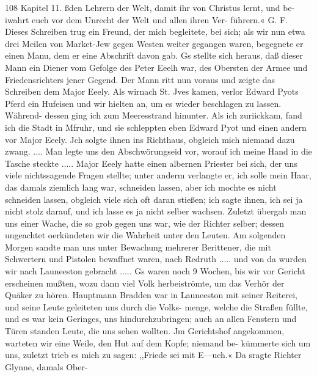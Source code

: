 108 Kapitel 11.
ßden Lehrern der Welt, damit ihr von Christus lernt, und be-
iwahrt euch vor dem Unrecht der Welt und allen ihren Ver-
führern.« G. F.
Dieses Schreiben trug ein Freund, der mich begleitete, bei
sich; als wir nun etwa drei Meilen von Market-Jew gegen
Westen weiter gegangen waren, begegnete er einen Manu, dem
er eine Abschrift davon gab. Gs stellte sich heraus, daß dieser
Mann ein Diener vom Gefolge des Peter Eeelh war, des
Obersten der Armee und Friedensrichters jener Gegend. Der Mann
ritt nun voraus und zeigte das Schreiben dem Major Eeely. Als
wirnach St. Jves kamen, verlor Edward Pyots Pferd ein Hufeisen
und wir hielten an, um es wieder beschlagen zu lassen. Während-
dessen ging ich zum Meeresstrand hinunter. Als ich zuriickkam,
fand ich die Stadt in Mfruhr, und sie schleppten eben Edward
Pyot und einen andern vor Major Eeely. Jch solgte ihnen ins
Richthaus, obgleich mich niemand dazu zwang. .... Man
legte uns den Abschwörungseid vor, worauf ich meine Hand in
die Tasche steckte ..... Major Eeely hatte einen albernen
Priester bei sich, der uns viele nichtssagende Fragen stellte; unter
anderm verlangte er, ich solle mein Haar, das damals ziemlich
lang war, schneiden lassen, aber ich mochte es nicht schneiden
lassen, obgleich viele sich oft daran stießen; ich sagte ihnen, ich
sei ja nicht stolz darauf, und ich lasse es ja nicht selber wachsen.
Zuletzt übergab man uns einer Wache, die so grob gegen uns
war, wie der Richter selber; dessen ungeachtet oerkündeten wir
die Wahrheit unter den Leuten. Am solgenden Morgen sandte
man uns unter Bewachung mehrerer Berittener, die mit Schwertern
und Pistolen bewaffnet waren, nach Redruth ..... und von da
wurden wir nach Launeeston gebracht .....
Gs waren noch 9 Wochen, bis wir vor Gericht erscheinen
mußten, wozu dann viel Volk herbeiströmte, um das Verhör der
Quäker zu hören. Hauptmann Bradden war in Launeeston mit
seiner Reiterei, und seine Leute geleiteten uns durch die Volks-
menge, welche die Straßen füllte, und es war kein Geringes, uns
hindurchzubringen; auch an allen Fenstern und Türen standen
Leute, die uns sehen wollten. Jm Gerichtshof angekommen,
warteten wir eine Weile, den Hut auf dem Kopfe; niemand be-
kümmerte sich um uns, zuletzt trieb es mich zu sagen: ,,Friede
sei mit E—uch.« Da sragte Richter Glynne, damals Ober-


